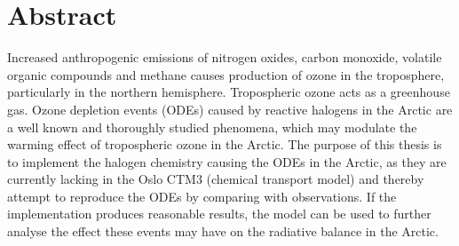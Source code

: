 \chapter*{Abstract}



Increased anthropogenic emissions of nitrogen oxides, carbon monoxide, volatile organic compounds and methane causes production of ozone in the troposphere, particularly in the northern hemisphere. Tropospheric ozone acts as a greenhouse gas. Ozone depletion events (ODEs) caused by reactive halogens in the Arctic are a well known and thoroughly studied phenomena, which may modulate the warming effect of tropospheric ozone in the Arctic. The purpose of this thesis is to implement the halogen chemistry causing the ODEs in the Arctic, as they are currently lacking in the Oslo CTM3 (chemical transport model) and thereby attempt to reproduce the ODEs by comparing with observations. If the implementation produces reasonable results, the model can be used to further analyse the effect these events may have on the radiative balance in the Arctic. 
\cleardoublepage